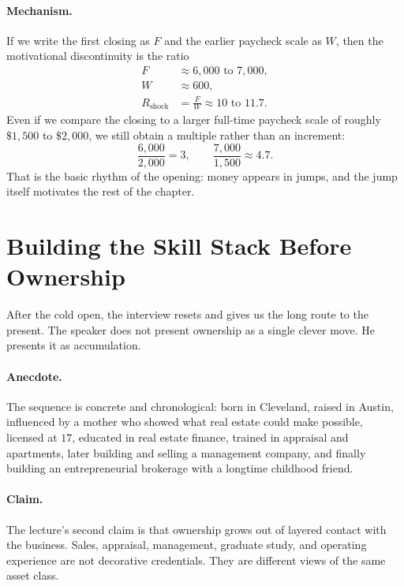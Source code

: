 \paragraph{Mechanism.}
If we write the first closing as \(F\) and the earlier paycheck scale as \(W\), then the motivational discontinuity is the ratio
\begin{align}
F &\approx 6{,}000 \text{ to } 7{,}000, \\
W &\approx 600, \\
R_{\mathrm{shock}} &= \frac{F}{W} \approx 10 \text{ to } 11.7 .
\end{align}
Even if we compare the closing to a larger full-time paycheck scale of roughly \(\$1{,}500\) to \(\$2{,}000\), we still obtain a multiple rather than an increment:
\begin{equation}
\frac{6{,}000}{2{,}000}=3,
\qquad
\frac{7{,}000}{1{,}500}\approx 4.7 .
\end{equation}
That is the basic rhythm of the opening: money appears in jumps, and the jump itself motivates the rest of the chapter.

\section{Building the Skill Stack Before Ownership}

After the cold open, the interview resets and gives us the long route to the present. The speaker does not present ownership as a single clever move. He presents it as accumulation.

\paragraph{Anecdote.}
The sequence is concrete and chronological: born in Cleveland, raised in Austin, influenced by a mother who showed what real estate could make possible, licensed at \(17\), educated in real estate finance, trained in appraisal and apartments, later building and selling a management company, and finally building an entrepreneurial brokerage with a longtime childhood friend.

\paragraph{Claim.}
The lecture's second claim is that ownership grows out of layered contact with the business. Sales, appraisal, management, graduate study, and operating experience are not decorative credentials. They are different views of the same asset class.


